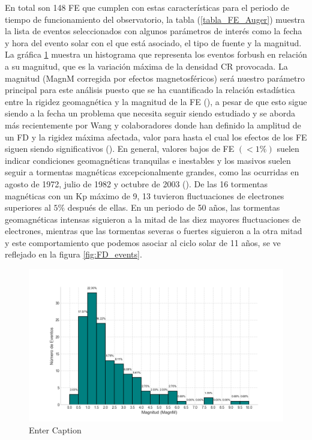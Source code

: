 En total son 148 FE que cumplen con estas características para el periodo de tiempo de funcionamiento del observatorio, la tabla (\ref{tabla_FE_Auger}) muestra la lista de eventos seleccionados con algunos parámetros de interés como la fecha y hora del evento solar con el que está asociado, el tipo de fuente y la magnitud.
La gráfica \ref{hist_FE} muestra un histograma que representa los eventos forbush  en relación a su magnitud, 
que es la variación máxima de la densidad CR provocada. La magnitud (MagnM corregida por efectos magnetosféricos) será nuestro parámetro principal para este análisis puesto que se ha cuantificado la relación estadística entre la rigidez geomagnética y la magnitud de la FE (\cite{belov_2009}), a pesar de que esto sigue siendo a la fecha un problema que necesita seguir siendo estudiado y se aborda más recientemente por Wang y colaboradores  donde han definido la amplitud de un FD y la rigidez máxima afectada, valor para hasta el cual los efectos de los FE siguen siendo significativos (\cite{wang_2023}). En general, valores bajos de FE $(<1\%)$ suelen indicar condiciones geomagnéticas tranquilas e inestables y los masivos suelen seguir a tormentas magnéticas excepcionalmente grandes, como las ocurridas en agosto de 1972, julio de 1982 y octubre de 2003 (\cite{belov_2009}).  De las 16 tormentas magnéticas con un Kp máximo de 9, 13 tuvieron fluctuaciones de electrones superiores al $5\%$ después de ellas. En un periodo de 50 años, las tormentas geomagnéticas intensas siguieron a la mitad de las diez mayores fluctuaciones de electrones, mientras que las tormentas severas o fuertes siguieron a la otra mitad y este comportamiento que podemos asociar al ciclo solar de 11 años, se ve reflejado en la figura \ref{fig:FD_events}.
\begin{figure}
    \includegraphics[width=1\linewidth]{Figs/Figr/CRI_FD_HISTOGRAMA.png}
    \caption{Enter Caption}
    \label{hist_FE}
\end{figure}
